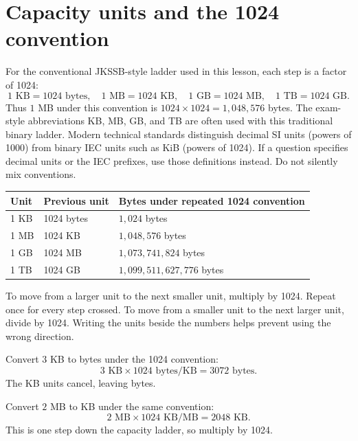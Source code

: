 \section{Capacity units and the 1024 convention}
For the conventional JKSSB-style ladder used in this lesson, each step is a
factor of 1024:
\[
1\text{ KB}=1024\text{ bytes},\quad
1\text{ MB}=1024\text{ KB},\quad
1\text{ GB}=1024\text{ MB},\quad
1\text{ TB}=1024\text{ GB}.
\]
Thus $1$ MB under this convention is $1024\times1024=1{,}048{,}576$ bytes.
The exam-style abbreviations KB, MB, GB, and TB are often used with this
traditional binary ladder. Modern technical standards distinguish decimal
SI units (powers of 1000) from binary IEC units such as KiB (powers of 1024).
If a question specifies decimal units or the IEC prefixes, use those
definitions instead. Do not silently mix conventions.

\begin{center}
\begin{tabular}{p{}p{}p{}}
\toprule
\textbf{Unit} & \textbf{Previous unit} & \textbf{Bytes under repeated 1024 convention}\\
\midrule
1 KB & 1024 bytes & $1{,}024$ bytes\\
1 MB & 1024 KB & $1{,}048{,}576$ bytes\\
1 GB & 1024 MB & $1{,}073{,}741{,}824$ bytes\\
1 TB & 1024 GB & $1{,}099{,}511{,}627{,}776$ bytes\\
\bottomrule
\end{tabular}
\end{center}

To move from a larger unit to the next smaller unit, multiply by 1024.
Repeat once for every step crossed. To move from a smaller unit to the next
larger unit, divide by 1024. Writing the units beside the numbers helps
prevent using the wrong direction.

\begin{example}
Convert $3$ KB to bytes under the 1024 convention:
\[
3\text{ KB}\times 1024\text{ bytes/KB}=3072\text{ bytes}.
\]
The KB units cancel, leaving bytes.
\end{example}

\begin{example}
Convert $2$ MB to KB under the same convention:
\[
2\text{ MB}\times 1024\text{ KB/MB}=2048\text{ KB}.
\]
This is one step down the capacity ladder, so multiply by 1024.
\end{example}

